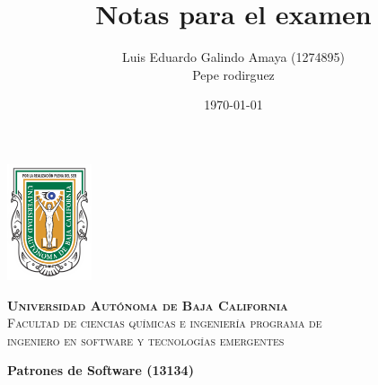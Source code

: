 \documentclass{article}
\title{Notas para el examen  }
\author{Luis Eduardo Galindo Amaya (1274895) \\ Pepe rodirguez }
\date{\today}
\newcommand{\university}{Universidad Autónoma de Baja California}
\newcommand{\program}{ingeniero en software y tecnologías emergentes}
\newcommand{\subject}{Patrones de Software (13134)}
\begin{document}
    \setlength\parindent{0pt}   %
    \setlength{\parskip}{1em}   %
    \makeatletter

    \begin{titlepage} 
        \thispagestyle{empty}
        \noindent

        \noindent\begin{minipage}{0.2\textwidth}
            \includegraphics[width=2.5cm]{images/escudo-uabc-2022-color-cont.png} 
        \end{minipage}%
        \hfill%
        \begin{minipage}{0.8\textwidth} %
            \scshape
            \textbf{\university } \vspace*{2mm} \\ 
            Facultad de ciencias químicas e ingeniería programa de \\ \program
        \end{minipage}

        
    
        \vspace*{2cm}
        \hfill
        \begin{minipage}{0.8\textwidth}

            
            \bfseries
            \huge
            \subject 
            \Huge
            \vspace*{1.3cm} \\

            \begin{minipage}{0.9\textwidth}
                \@title
            \end{minipage}

            \huge
            \vspace*{4cm} 

            \@date 


\end{minipage}
\end{titlepage}
\end{document}
